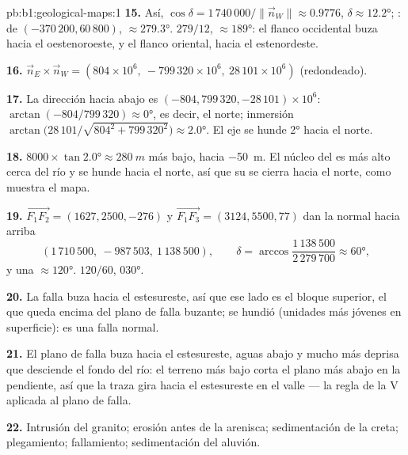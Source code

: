 \begin{solution}{pb:b1:geological-maps:1}
\textbf{15.} Así, $\cos\delta = 1\,740\,000/\|\vec n_W\| \approx 0.9776$, $\delta
\approx \ang{12.2}$; :  de $(-370\,200, 60\,800)$,
$\approx \ang{279.3}$.  $279/12$,  $\approx \ang{189}$: el flanco occidental buza hacia
el oestenoroeste, y el flanco oriental, hacia el estenordeste.

\textbf{16.} $\vec n_E \times \vec n_W = (804 \times 10^6,\ -799\,320 \times
10^6,\ 28\,101 \times 10^6)$ (redondeado).

\textbf{17.} La dirección hacia abajo es $(-804, 799\,320, -28\,101) \times
10^6$:  $\arctan(-804/799\,320) \approx \ang{0}$, es decir, el norte; inmersión
$\arctan\bigl(28\,101/\sqrt{804^2 + 799\,320^2}\bigr) \approx \ang{2.0}$. El eje se hunde
\ang{2} hacia el norte.

\textbf{18.} $8000 \times \tan\ang{2.0} \approx \qty{280}{m}$ más bajo, hacia
\qty{-50}{m}. El núcleo del  es más alto cerca del río y se hunde hacia el norte, así que
su  se cierra hacia el norte, como muestra el mapa.

\textbf{19.} $\overrightarrow{F_1F_2} = (1627, 2500, -276)$ y
$\overrightarrow{F_1F_3} = (3124, 5500, 77)$ dan la normal hacia arriba
\[
  (1\,710\,500,\ -987\,503,\ 1\,138\,500), \qquad
  \delta = \arccos\frac{1\,138\,500}{2\,279\,700} \approx \ang{60},
\]
y una  $\approx \ang{120}$.  $120/60$,  \ang{030}.

\textbf{20.} La falla buza hacia el estesureste, así que ese lado es el bloque superior, el que queda
encima del plano de falla buzante; se hundió (unidades más jóvenes en superficie): es una falla normal.

\textbf{21.} El plano de falla buza hacia el estesureste, aguas abajo y mucho más deprisa que
desciende el fondo del río: el terreno más bajo corta el plano más abajo en la pendiente, así que la
traza gira hacia el estesureste en el valle --- la regla de la V aplicada al plano de falla.

\textbf{22.} Intrusión del granito; erosión antes de la arenisca; sedimentación de la creta;
plegamiento; fallamiento; sedimentación del aluvión.


\end{solution}

